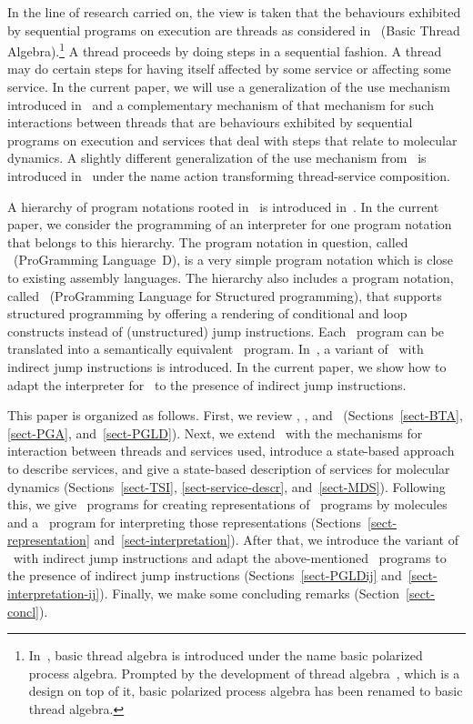 \documentclass[fleqn]{llncs}
\begin{document}
In the line of research carried on, the view is taken that the
behaviours exhibited by sequential programs on execution are threads as
considered in \BTA\ (Basic Thread Algebra).\footnote
{In~\cite{BL02a}, basic thread algebra is introduced under the name
 basic polarized process algebra.
 Prompted by the development of thread algebra~\cite{BM04c}, which is a
 design on top of it, basic polarized process algebra has been renamed
 to basic thread algebra.
}
A thread proceeds by doing steps in a sequential fashion.
A thread may do certain steps for having itself affected by some service
or affecting some service.
In the current paper, we will use a generalization of the use mechanism
introduced in~\cite{BM04c} and a complementary mechanism of that
mechanism for such interactions between threads that are behaviours
exhibited by sequential programs on execution and services that deal
with steps that relate to molecular dynamics.
A slightly different generalization of the use mechanism
from~\cite{BM04c} is introduced in~\cite{BM07f} under the name action
transforming thread-service composition.

A hierarchy of program notations rooted in \PGA\ is introduced
in~\cite{BL02a}.
In the current paper, we consider the programming of an interpreter for
one program notation that belongs to this hierarchy.
The program notation in question, called \PGLD\ (ProGramming
Language~D), is a very simple program notation which is close to
existing assembly languages.
The hierarchy also includes a program notation, called \PGLS\
(ProGramming Language for Structured programming), that supports
structured programming by offering a rendering of conditional and loop
constructs instead of (unstructured) jump instructions.
Each \PGLS\ program can be translated into a semantically equivalent
\PGLD\ program.
In~\cite{BM07e}, a variant of \PGLD\ with indirect jump instructions is
introduced.
In the current paper, we show how to adapt the interpreter for \PGLD\ to
the presence of indirect jump instructions.

This paper is organized as follows.
First, we review \BTA, \PGA, and \PGLD\ (Sections~\ref{sect-BTA},
\ref{sect-PGA}, and~\ref{sect-PGLD}).
Next, we extend \BTA\ with the mechanisms for interaction between
threads and services used, introduce a state-based approach to describe
services, and give a state-based description of services for molecular
dynamics (Sections~\ref{sect-TSI}, \ref{sect-service-descr},
and~\ref{sect-MDS}).
Following this, we give \PGA\ programs for creating representations of
\PGLD\ programs by molecules and a \PGA\ program for interpreting those
representations (Sections~\ref{sect-representation}
and~\ref{sect-interpretation}).
After that, we introduce the variant of \PGLD\ with indirect jump
instructions and adapt the above-mentioned \PGA\ programs to the
presence of indirect jump instructions (Sections~\ref{sect-PGLDij}
and~\ref{sect-interpretation-ij}).
Finally, we make some concluding remarks (Section~\ref{sect-concl}).
\end{document}
